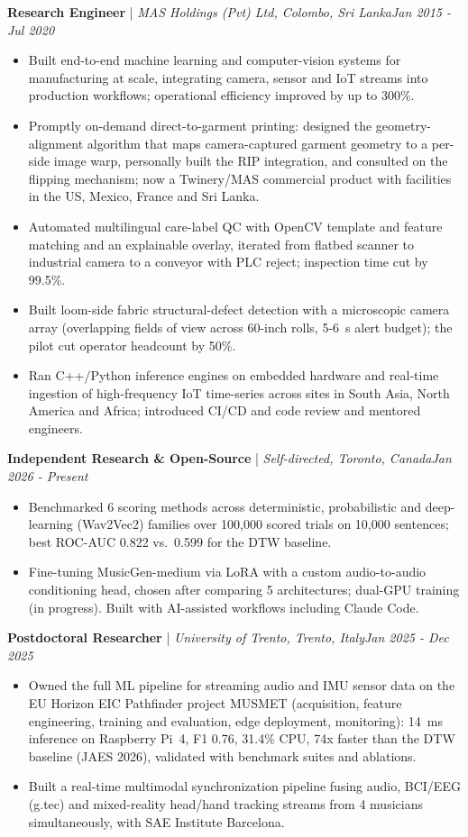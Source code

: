 \documentclass[11pt]{article}
\newenvironment{cvrole}[5]{%
  \par\noindent\textbf{\large #1} | \textit{\small #2, #3}\hfill \textit{\small #4 - #5}\par
  \begin{itemize}[leftmargin=2em, itemsep=-0.3em, topsep=-0.5em]%
}{%
  \end{itemize}\par\noindent\mbox{}\par\vspace{0.1em}%
}
\begin{document}
\begin{cvrole}{Research Engineer}{MAS Holdings (Pvt) Ltd}{Colombo, Sri Lanka}{Jan 2015}{Jul 2020}
    \item Built end-to-end machine learning and computer-vision systems for manufacturing at scale, integrating camera, sensor and IoT streams into production workflows; operational efficiency improved by up to 300\%.
    \item Promptly on-demand direct-to-garment printing: designed the geometry-alignment algorithm that maps camera-captured garment geometry to a per-side image warp, personally built the RIP integration, and consulted on the flipping mechanism; now a Twinery/MAS commercial product with facilities in the US, Mexico, France and Sri Lanka.
    \item Automated multilingual care-label QC with OpenCV template and feature matching and an explainable overlay, iterated from flatbed scanner to industrial camera to a conveyor with PLC reject; inspection time cut by 99.5\%.
    \item Built loom-side fabric structural-defect detection with a microscopic camera array (overlapping fields of view across 60-inch rolls, 5-6~s alert budget); the pilot cut operator headcount by 50\%.
    \item Ran C++/Python inference engines on embedded hardware and real-time ingestion of high-frequency IoT time-series across sites in South Asia, North America and Africa; introduced CI/CD and code review and mentored engineers.
\end{cvrole}

\begin{cvrole}{Independent Research \& Open-Source}{Self-directed}{Toronto, Canada}{Jan 2026}{Present}
    \item Benchmarked 6 scoring methods across deterministic, probabilistic and deep-learning (Wav2Vec2) families over 100,000 scored trials on 10,000 sentences; best ROC-AUC 0.822 vs.\ 0.599 for the DTW baseline.
    \item Fine-tuning MusicGen-medium via LoRA with a custom audio-to-audio conditioning head, chosen after comparing 5 architectures; dual-GPU training (in progress). Built with AI-assisted workflows including Claude Code.
\end{cvrole}

\begin{cvrole}{Postdoctoral Researcher}{University of Trento}{Trento, Italy}{Jan 2025}{Dec 2025}
    \item Owned the full ML pipeline for streaming audio and IMU sensor data on the EU Horizon EIC Pathfinder project MUSMET (acquisition, feature engineering, training and evaluation, edge deployment, monitoring): 14~ms inference on Raspberry Pi~4, F1 0.76, 31.4\% CPU, 74x faster than the DTW baseline (JAES 2026), validated with benchmark suites and ablations.
    \item Built a real-time multimodal synchronization pipeline fusing audio, BCI/EEG (g.tec) and mixed-reality head/hand tracking streams from 4 musicians simultaneously, with SAE Institute Barcelona.
\end{cvrole}
\end{document}
